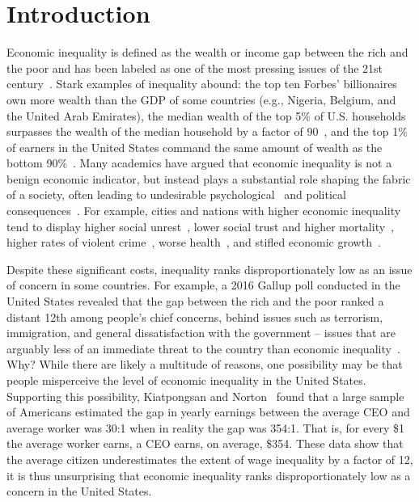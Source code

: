 \documentclass{sfuthesis}
\begin{document}
%
%

\mainmatter%

\chapter{Introduction}

Economic inequality is defined as the wealth or income gap between the rich and the poor and has been labeled as one of the most pressing issues of the 21st century~\cite{obama13, piketty14, wilkinson17}. Stark examples of inequality abound: the top ten Forbes’ billionaires own more wealth than the GDP of some countries (e.g., Nigeria, Belgium, and the United Arab Emirates), the median wealth of the top 5\% of U.S. households surpasses the wealth of the median household by a factor of 90~\cite{inequalityorg17}, and the top 1\% of earners in the United States command the same amount of wealth as the bottom 90\%~\cite{Wolff10}. Many academics have argued that economic inequality is not a benign economic indicator, but instead plays a substantial role shaping the fabric of a society, often leading to undesirable psychological~\cite{wilkinson06b, wilkinson06} and political consequences~\cite{murphy01}. For example, cities and nations with higher economic inequality tend to display higher social unrest~\cite{lichbach89}, lower social trust and higher mortality~\cite{kawachi97}, higher rates of violent crime~\cite{wilson97}, worse health~\cite{wilkinson06}, and stifled economic growth~\cite{persson94}.

Despite these significant costs, inequality ranks disproportionately low as an issue of concern in some countries. For example, a 2016 Gallup poll conducted in the United States revealed that the gap between the rich and the poor ranked a distant 12th among people’s chief concerns, behind issues such as terrorism, immigration, and general dissatisfaction with the government – issues that are arguably less of an immediate threat to the country than economic inequality~\cite{mccarthy16}. Why? While there are likely a multitude of reasons, one possibility may be that people misperceive the level of economic inequality in the United States. Supporting this possibility, Kiatpongsan and Norton~\cite{kiatpongsan14} found that a large sample of Americans estimated the gap in yearly earnings between the average CEO and average worker was 30:1 when in reality the gap was 354:1. That is, for every \$1 the average worker earns, a CEO earns, on average, \$354. These data show that the average citizen underestimates the extent of wage inequality by a factor of 12, it is thus unsurprising that economic inequality ranks disproportionately low as a concern in the United States.
\end{document}
